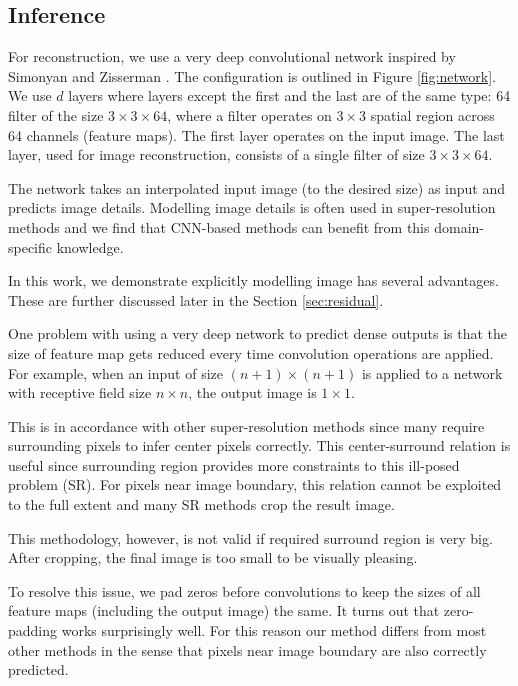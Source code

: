 \documentclass[10pt,twocolumn,letterpaper]{article}
\begin{document}
\subsection{Inference}

For reconstruction, we use a very deep convolutional network inspired by Simonyan and Zisserman \cite{simonyan2015very}. The configuration is outlined in Figure \ref{fig:network}. We use $d$ layers where layers except the first and the last are of the same type: 64 filter of the size $3\times 3 \times64$, where a filter operates on $3\times3$ spatial region across 64 channels (feature maps). The first layer operates on the input image. The last layer, used for image reconstruction, consists of a single filter of size $3\times 3 \times64$.

The network takes an interpolated input image (to the desired size) as input and predicts image details. Modelling image details is often used in super-resolution methods \cite{Timofte2013, Timofte, bevilacqua2012,bevilacqua2013super} and we find that CNN-based methods can benefit from this domain-specific knowledge.

In this work, we demonstrate explicitly modelling image has several advantages. These are further discussed later in the Section \ref{sec:residual}. 

One problem with using a very deep network to predict dense outputs is that the size of feature map gets reduced every time convolution operations are applied. For example,  when an input of size $(n+1)\times (n+1)$ is applied to a network with receptive field size $n\times n$, the output image is $1\times1$. 

This is in accordance with other super-resolution methods since many require surrounding pixels to infer center pixels correctly. This center-surround relation is useful since surrounding region provides more constraints to this ill-posed problem (SR). For pixels near image boundary, this relation cannot be exploited to the full extent and many SR methods crop the result image. 

This methodology, however, is not valid if required surround region is very big. After cropping, the final image is too small to be visually pleasing.

To resolve this issue, we pad zeros before convolutions to keep the sizes of all feature maps (including the output image) the same. It turns out that zero-padding works surprisingly well. For this reason our method differs from most other methods in the sense that pixels near image boundary are also correctly predicted.  
\end{document}
